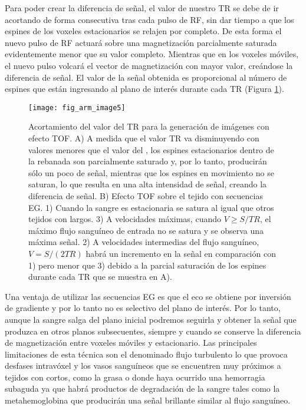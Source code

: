 Para poder crear la diferencia de señal, el valor de nuestro TR se debe de ir acortando de forma consecutiva tras cada pulso de RF, sin dar tiempo a que los espines de los voxeles estacionarios se relajen por completo. De esta forma el nuevo pulso de RF actuará sobre una magnetización parcialmente saturada evidentemente menor que su valor completo. Mientras que en los voxeles móviles, el nuevo pulso volcará el vector de magnetización con mayor valor, creándose la diferencia de señal. El valor de la señal obtenida es proporcional al número de espines que están ingresando al plano de interés durante cada TR (Figura \ref{fig:arm_image5}). 


\begin{figure}[htbp]
\begin{figg}
 \texttt{[image: fig\_arm\_image5]}
 \caption{
Acortamiento del valor del TR para la generación de imágenes con efecto TOF. A) A medida que el valor TR va disminuyendo con valores menores que el valor del \Tone, los espines estacionarios dentro de la rebanada son parcialmente saturado y, por lo tanto, producirán sólo un poco de señal, mientras que los espines en movimiento no se saturan, lo que resulta en una alta intensidad de señal, creando la diferencia de señal. B) Efecto TOF sobre el tejido con secuencias EG. 1) Cuando la sangre es estacionaria se satura al igual que otros tejidos con \Tone largos. 3) A velocidades máximas, cuando $V \geq S/TR$, el máximo flujo sanguíneo de entrada no se satura y se observa una máxima señal. 2) A velocidades intermedias del flujo sanguíneo,$V=S/(2TR)$ habrá un incremento en la señal en comparación con 1) pero menor que 3) debido a la parcial saturación de los espines durante cada TR que se muestra en A).
 }
 \label{fig:arm_image5}
\end{figg}
\end{figure}

Una ventaja de utilizar las secuencias EG es que el eco se obtiene por inversión de gradiente y por lo tanto no es selectivo del plano de interés. Por lo tanto, aunque la sangre salga del plano inicial podremos seguirla y obtener la señal que produzca en otros planos subsecuentes, siempre y cuando se conserve la diferencia de magnetización entre voxeles móviles y estacionario. Las principales limitaciones de esta técnica son el denominado flujo turbulento lo que provoca desfases intravóxel y los vasos sanguíneos que se encuentren muy próximos a tejidos con \Tone cortos, como la grasa o donde haya ocurrido una hemorragia subaguda ya que habrá productos de degradación de la sangre tales como la metahemoglobina que producirán una señal brillante similar al flujo sanguíneo. 

